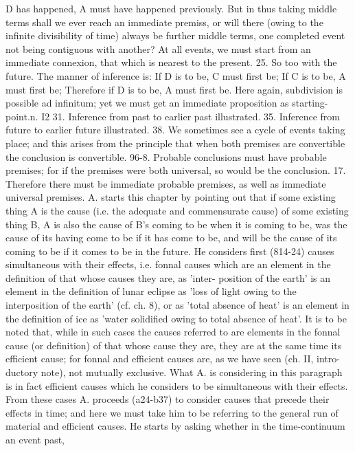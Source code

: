 {{{{{{{{{{{{{{{{{{{{{{{{{{{{{{{{{{{{{{{{{{{{{{{{{{{{{{{{{{{{{{{D has happened, A must have happened previously. But in
thus taking middle terms shall we ever reach an immediate
premiss, or will there (owing to the infinite divisibility of time)
always be further middle terms, one completed event not being
contiguous with another? At all events, we must start from an
immediate connexion, that which is nearest to the present.
25. So too with the future. The manner of inference is: If
D is to be, C must first be; If C is to be, A must first be; Therefore
if D is to be, A must first be. Here again, subdivision is possible
ad infinitum; yet we must get an immediate proposition as
starting-point.n.
I2
31. Inference from past to earlier past illustrated.
35. Inference from future to earlier future illustrated.
38. We sometimes see a cycle of events taking place; and this
arises from the principle that when both premises are convertible
the conclusion is convertible.
96-8. Probable conclusions must have probable premises; for
if the premises were both universal, so would be the conclusion.
17. Therefore there must be immediate probable premises,
as well as immediate universal premises.
A. starts this chapter by pointing out that if some existing
thing A is the cause (i.e. the adequate and commensurate cause)
of some existing thing B, A is also the cause of B's coming to
be when it is coming to be, was the cause of its having come to
be if it has come to be, and will be the cause of its coming to be
if it comes to be in the future. He considers first (814-24) causes
simultaneous with their effects, i.e. fonnal causes which are an
element in the definition of that whose causes they are, as 'inter-
position of the earth' is an element in the definition of lunar
eclipse as 'loss of light owing to the interposition of the earth'
(cf. ch. 8), or as 'total absence of heat' is an element in the
definition of ice as 'water solidified owing to total absence of
heat'.
It is to be noted that, while in such cases the causes referred
to are elements in the fonnal cause (or definition) of that whose
cause they are, they are at the same time its efficient cause; for
fonnal and efficient causes are, as we have seen (ch. II, intro-
ductory note), not mutually exclusive. What A. is considering
in this paragraph is in fact efficient causes which he considers
to be simultaneous with their effects.
From these cases A. proceeds (a24-b37) to consider causes that
precede their effects in time; and here we must take him to be
referring to the general run of material and efficient causes. He
starts by asking whether in the time-continuum an event past,
}}}}}}}}}}}}}}}}}}}}}}}}}}}}}}}}}}}}}}}}}}}}}}}}}}}}}}}}}}}}}}}
